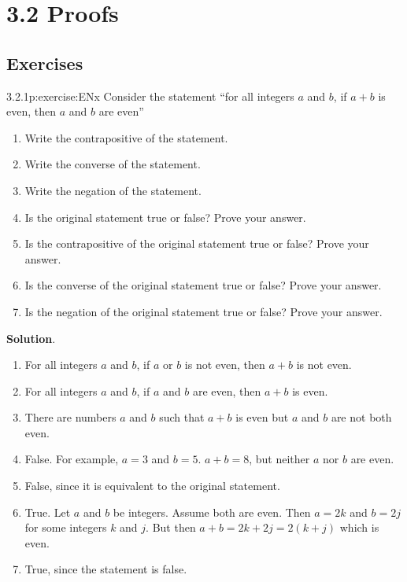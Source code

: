 \documentclass[twoside,11pt,]{book}
\newcommand{\blocktitlefont}{\relax}
\numberwithin{equation}{chapter}
\begin{document}
\section*{3.2 Proofs}
\subsection*{Exercises}
\begin{divisionsolution}{3.2.1}{}{p:exercise:ENx}%
Consider the statement ``for all integers \(a\) and \(b\), if \(a + b\) is even, then \(a\) and \(b\) are even''%
\begin{enumerate}[label=(\alph*)]
\item{}Write the contrapositive of the statement.%
\item{}Write the converse of the statement.%
\item{}Write the negation of the statement.%
\item{}Is the original statement true or false? Prove your answer.%
\item{}Is the contrapositive of the original statement true or false? Prove your answer.%
\item{}Is the converse of the original statement true or false? Prove your answer.%
\item{}Is the negation of the original statement true or false? Prove your answer.%
\end{enumerate}
%
\par\smallskip%
\noindent\textbf{\blocktitlefont Solution}.\quad{}%
\begin{enumerate}[label=(\alph*)]
\item{}For all integers \(a\) and \(b\), if \(a\) or \(b\) is not even, then \(a+b\) is not even.%
\item{}For all integers \(a\) and \(b\), if \(a\) and \(b\) are even, then \(a+b\) is even.%
\item{}There are numbers \(a\) and \(b\) such that \(a+b\) is even but \(a\) and \(b\) are not both even.%
\item{}False. For example, \(a = 3\) and \(b = 5\). \(a+b = 8\), but neither \(a\) nor \(b\) are even.%
\item{}False, since it is equivalent to the original statement.%
\item{}True. Let \(a\) and \(b\) be integers. Assume both are even. Then \(a = 2k\) and \(b = 2j\) for some integers \(k\) and \(j\). But then \(a+b = 2k + 2j = 2(k+j)\) which is even.%
\item{}True, since the statement is false.%
\end{enumerate}
%
\end{divisionsolution}%
\end{document}
